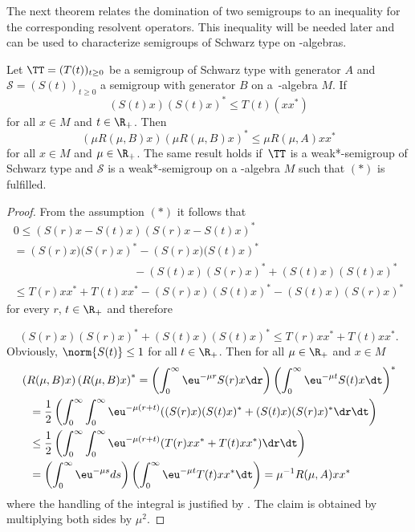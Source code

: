 The next theorem relates the domination of two semigroups to an inequality for the corresponding resolvent operators.
This inequality will be needed later and can be used to characterize semigroups of Schwarz type on \CA-algebras.
\begin{theorem}\label{thm:d1-2.1}
Let $  \TT  = (T(t))_{t\geq0} $ be a semigroup of Schwarz type with generator $ A $ and $ \mathcal{S} = (S(t))_{t\geq0} $ a semigroup with generator $ B $ on a\, \CA-algebra $ M $.
If
\begin{equation}
	(S(t)x)(S(t)x)^{*} \leq T(t)(xx^{*}) \tag{*}
\end{equation}
for all $ x \in M $ and $ t \in \R_{+} $.
Then  
\[
	\left( \mu R(\mu,B)x \right) \left( \mu R(\mu,B)x \right)^{*} \leq \mu R(\mu,A)xx^{*}
\]
for all $ x \in M $ and $ \mu \in \R_{+} $.
The same result holds if\/ $ \,\TT $ is a weak*-semigroup of Schwarz type and $ \mathcal{S} $ is a weak*-semigroup on a \WA-algebra $ M $ such that $ (*) $ is fulfilled.
\end{theorem}
\begin{proof}
From the assumption $ (*) $ it follows that
\begin{multline*}
	0 	 \leq \left( S(r)x - S(t)x \right) \left( S(r)x - S(t)x \right)^{*} {} \\
		  = \left( S(r)x)(S(r)x \right)^{*} - \left( S(r)x)(S(t)x \right)^{*} \\
		 \phantom{(S(r)x)(S(r)x)^{*}} - (S(t)x)(S(r)x)^{*} + (S(t)x)(S(t)x)^{*}  \\
		\leq T(r)xx^{*} + T(t)xx^{*}   - (S(r)x)(S(t)x)^{*} -  
		   (S(t)x)(S(r)x)^{*}
\end{multline*}
for every $ r $, $ t \in \R_{+} $ and therefore

\[
	(S(r)x)(S(r)x)^{*} + (S(t)x)(S(t)x)^{*} \leq T(r)xx^{*} + T(t)xx^{*} .
\]
Obviously, $ \norm{ S(t)} \leq 1 $ for all $ t \in \R_{+} $.
Then for all $ \mu \in \R_{+} $ and $ x \in M $
\begin{align*}
	 {}& \left( R(\mu,B)x  \right) \left( R(\mu,B)x \right)^{*} 
		= \left( \int_{0}^\infty \eu^{-\mu r}S(r)x \dr \right)
			\left( \int_{0}^\infty \eu^{-\mu t}S(t)x \dt \right)^{*}   \\
	&\phantom{=}= \frac{1}{2} \left( \int_{0}^\infty \int_{0}^\infty \eu^{-\mu(r+t)} ((S(r)x)(S(t)x)^{*}  
			+ (S(t)x)(S(r)x)^{*}  \dr \dt \right) \\
	&\phantom{=}\leq \frac{1}{2} \left(\int_{0}^\infty \int_{0}^\infty \eu^{-\mu(r+t)} (T(r)xx^{*} + T(t)xx^{*})  			\dr \dt \right)\\
	&\phantom{=}= \left( \int_{0}^\infty \eu^{-\mu s} ds \right)
			\left( \int_{0}^\infty \eu^{-\mu t}T(t)xx^{*} \dt \right) 
				= \mu^{-1}R(\mu,A)xx^{*}
\end{align*}
where the handling of the integral is justified by \textcite[Chap. V, §8, n° 4, Proposition 9]{bourbaki:1955}.
The claim is obtained by multiplying both sides by $\mu^{2} $. 
\end{proof}
